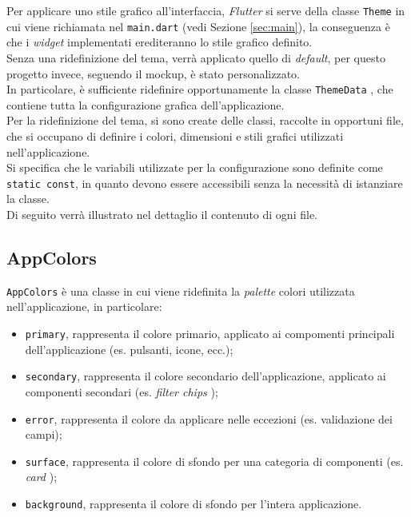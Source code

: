 Per applicare uno stile grafico all'interfaccia, \emph{Flutter} \cite{site:flutter} si serve della classe \lstinline{Theme} \cite{site:theme-class} in cui viene richiamata nel \lstinline{main.dart} (vedi Sezione \ref{sec:main}), la conseguenza è che i \emph{widget} implementati erediteranno lo stile grafico definito. \\
Senza una ridefinizione del tema, verrà applicato quello di \emph{default}, per questo progetto invece, seguendo il \gls{mockup}\glsoccur, è stato personalizzato. \\
In particolare, è sufficiente ridefinire opportunamente la classe \lstinline{ThemeData} \cite{site:theme-data-class}, che contiene tutta la configurazione grafica dell'applicazione. \\
Per la ridefinizione del tema, si sono create delle classi, raccolte in opportuni file, che si occupano di definire i colori, dimensioni e stili grafici utilizzati nell'applicazione. \\
Si specifica che le variabili utilizzate per la configurazione sono definite come \lstinline{static const}, in quanto devono essere accessibili senza la necessità di istanziare la classe. \\
Di seguito verrà illustrato nel dettaglio il contenuto di ogni file.

\subsection{AppColors}
\label{subsec:app-colors}

\lstinline{AppColors} è una classe in cui viene ridefinita la \emph{palette} colori utilizzata nell'applicazione, in particolare:
\begin{itemize}
    \item \lstinline{primary}, rappresenta il colore primario, applicato ai compomenti principali dell'applicazione (es. pulsanti, icone, ecc.);
    \item \lstinline{secondary}, rappresenta il colore secondario dell'applicazione, applicato ai componenti secondari (es. \emph{filter chips} \cite{site:chips});
    \item \lstinline{error}, rappresenta il colore da applicare nelle eccezioni (es. validazione dei campi);
    \item \lstinline{surface}, rappresenta il colore di sfondo per una categoria di componenti (es. \emph{card} \cite{site:card});
    \item \lstinline{background}, rappresenta il colore di sfondo per l'intera applicazione.
\end{itemize}

